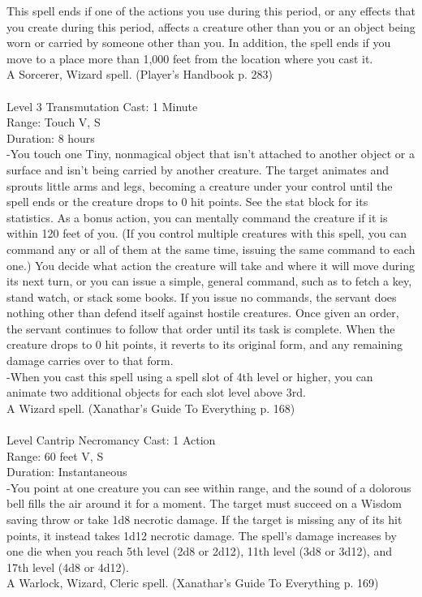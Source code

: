 \documentclass[10pt,twocolumn]{report}
\begin{document}
This spell ends if one of the actions you use during this period, or any effects that you create during this period, affects a creature other than you or an object being worn or carried by someone other than you. In addition, the spell ends if you move to a place more than 1,000 feet from the location where you cast it.\\
A Sorcerer, Wizard spell. (Player's Handbook p. 283) \\


 \\
Level 3 \quad Transmutation \quad Cast: 1 Minute\\
Range: Touch \quad V, S\\
Duration: 8 hours \quad \\
-You touch one Tiny, nonmagical object that isn’t attached to another object or a surface and isn’t being carried by another creature. The target animates and sprouts little arms and legs, becoming a creature under your control until the spell ends or the creature drops to 0 hit points. See the stat block for its statistics.
As a bonus action, you can mentally command the creature if it is within 120 feet of you. (If you control multiple creatures with this spell, you can command any or all of them at the same time, issuing the same command to each one.) You decide what action the creature will take and where it will move during its next turn, or you can issue a simple, general command, such as to fetch a key, stand watch, or stack some books. If you issue no commands, the servant does nothing other than defend itself against hostile creatures. Once given an order, the servant continues to follow that order until its task is complete.
When the creature drops to 0 hit points, it reverts to its original form, and any remaining damage carries over to that form.\\
-When you cast this spell using a spell slot of 4th level or higher, you can animate two additional objects for each slot level above 3rd.\\
A Wizard spell. (Xanathar's Guide To Everything p. 168) \\


 \\
Level Cantrip \quad Necromancy \quad Cast: 1 Action\\
Range: 60 feet \quad V, S\\
Duration: Instantaneous \quad \\
-You point at one creature you can see within range, and the sound of a dolorous bell fills the air around it for a moment. The target must succeed on a Wisdom saving throw or take 1d8 necrotic damage. If the target is missing any of its hit points, it instead takes 1d12 necrotic damage.
The spell’s damage increases by one die when you reach 5th level (2d8 or 2d12), 11th level (3d8 or 3d12), and 17th level (4d8 or 4d12).\\
A Warlock, Wizard, Cleric spell. (Xanathar's Guide To Everything p. 169) \\
\end{document}
